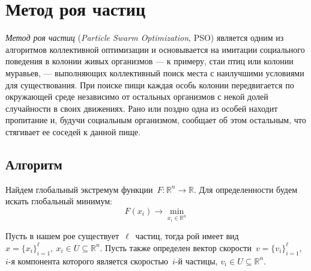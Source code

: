 

\section{Метод роя частиц}

\noindent
\emph{Метод роя частиц} (\emph{Particle Swarm Optimization}, PSO) является одним из алгоритмов коллективной оптимизации и основывается на имитации социального поведения в колонии живых организмов --- к примеру, стаи птиц или колонии муравьев, --- выполняющих коллективный поиск места с наилучшими условиями для существования. При поиске пищи каждая особь колонии передвигается по окружающей среде независимо от остальных организмов с некой долей случайности в своих движениях. Рано или поздно одна из особей находит пропитание и, будучи социальным организмом, сообщает об этом остальным, что стягивает ее соседей к данной пище.

\subsection{Алгоритм}
\noindent
Найдем глобальный экстремум функции~$F \colon \mathbb{R}^{n} \to \mathbb{R}$. Для определенности будем искать глобальный минимум:
\[
	F(x_i) \to \min \limits _{x_i \in \mathbb{R}^{n}}
\]

Пусть в нашем рое существует~$\ell$~частиц, тогда рой имеет вид~$x = \{x_i\}_{i = 1}^{\ell}, \ x_i \in U \subseteq \mathbb{R}^n$. Пусть также определен вектор скорости~$v = \{v_i\}_{i=1}^{\ell}$,~$i$-я компонента которого является скоростью~$i$-й частицы, $v_i \in U \subseteq \mathbb{R}^n$.

